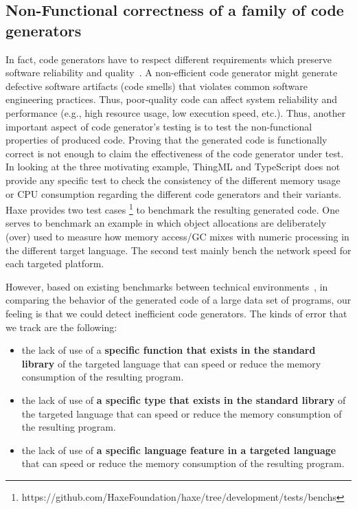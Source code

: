 \subsection{Non-Functional  correctness of a family of code generators}


In fact, code generators have to respect different requirements which preserve software reliability and quality~\cite{demertzi2011analyzing}. A non-efficient code generator might generate defective software artifacts (code smells) that violates common software engineering practices. Thus, poor-quality code can affect system reliability and performance (e.g., high resource usage, low execution speed, etc.). Thus, another important aspect of code generator's testing is to test the non-functional properties of produced code. Proving that the generated code is functionally correct is not enough to claim the effectiveness of the code generator under test. In looking at the three motivating example, ThingML and TypeScript does not provide any specific test to check the consistency of the different memory usage or CPU consumption regarding the different code generators and their variants. Haxe provides two test cases \footnote{https://github.com/HaxeFoundation/haxe/tree/development/tests/benchs} to benchmark the resulting generated code. One serves to benchmark an example in which object allocations are deliberately (over) used to measure how memory access/GC mixes with numeric processing in the different target language. The second test mainly bench the network speed for each targeted platform. 

However, based on existing benchmarks between technical environments~\cite{hundt2011loop}, in comparing the behavior of the generated code of a large data set of programs, our feeling is that we could detect inefficient code generators. The kinds of error that we track are the following:
\begin{itemize}
	\item  the lack of use of a \textbf{specific function that exists in the standard library} of the targeted language  that can speed or reduce the memory consumption of the resulting program.
	\item the lack of use of \textbf{a specific type that exists in the standard library} of the targeted language  that can speed or reduce the memory consumption of the resulting program.
	\item  the lack of use of\textbf{ a specific language feature in a targeted language}  that can speed or reduce the memory consumption of the resulting program. 
\end{itemize}

